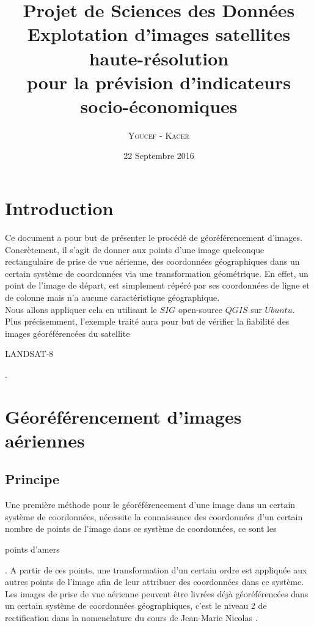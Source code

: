 \documentclass{book}
\title{%
  Projet de Sciences des Données \\
  \large Explotation d'images satellites haute-résolution \\pour la prévision d'indicateurs socio-économiques \\
    }
\author{\textsc{Youcef} - \textsc{Kacer}}
\date{22 Septembre 2016}
\begin{document}
 
\maketitle

\tableofcontents

\frontmatter
\chapter{Introduction}
Ce document a pour but de présenter le procédé de géoréférencement d'images. Concrètement, il s'agit de donner aux points 
d'une image quelconque rectangulaire de prise de vue aérienne, des coordonnées géographiques dans un certain système de coordonnées
via une transformation géométrique.
En effet, un point de l'image de départ, est simplement répéré par ses coordonnées de ligne et de colonne mais n'a aucune caractéristique
géographique.\\
Nous allons appliquer cela en utilisant le $SIG$ open-source $QGIS$ sur $Ubuntu$. Plus précisemment, l'exemple traité aura pour but de
vérifier la fiabilité des images géoréférencées du satellite \begin{itshape}LANDSAT-8\end{itshape}.

\mainmatter
\chapter{Géoréférencement d'images aériennes}
\section{Principe}\label{principe_geo}

Une première méthode pour le géoréférencement d'une image dans un certain système de coordonnées, nécessite la connaissance 
des coordonnées d'un 
certain nombre de points de l'image dans ce système de coordonnées, ce sont les \begin{itshape}points d'amers\end{itshape}.
A partir de ces points, une transformation d'un certain ordre est appliquée aux autres points de l'image afin de leur attribuer 
des coordonnées dans ce système.\\
Les images de prise de vue aérienne peuvent être livrées déjà géoréférencées dans un certain système de coordonnées géographiques, 
c'est le niveau 2 de rectification dans la nomenclature du cours de Jean-Marie Nicolas \cite{Nicolas:2014}.\\
\end{document}
